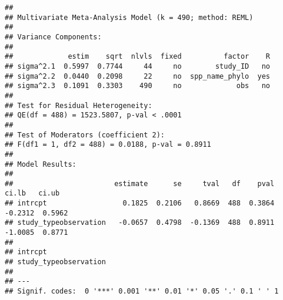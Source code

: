 \documentclass[]{article}
\newenvironment{Shaded}{\begin{snugshade}}{\end{snugshade}}
\newcommand{\KeywordTok}[1]{\textcolor[rgb]{0.13,0.29,0.53}{\textbf{#1}}}
\newcommand{\DataTypeTok}[1]{\textcolor[rgb]{0.13,0.29,0.53}{#1}}
\newcommand{\DecValTok}[1]{\textcolor[rgb]{0.00,0.00,0.81}{#1}}
\newcommand{\StringTok}[1]{\textcolor[rgb]{0.31,0.60,0.02}{#1}}
\newcommand{\CommentTok}[1]{\textcolor[rgb]{0.56,0.35,0.01}{\textit{#1}}}
\newcommand{\OperatorTok}[1]{\textcolor[rgb]{0.81,0.36,0.00}{\textbf{#1}}}
\newcommand{\NormalTok}[1]{#1}
\begin{document}
\begin{Shaded}
\end{Shaded}

\begin{verbatim}
## 
## Multivariate Meta-Analysis Model (k = 490; method: REML)
## 
## Variance Components:
## 
##             estim    sqrt  nlvls  fixed          factor    R 
## sigma^2.1  0.5997  0.7744     44     no        study_ID   no 
## sigma^2.2  0.0440  0.2098     22     no  spp_name_phylo  yes 
## sigma^2.3  0.1091  0.3303    490     no             obs   no 
## 
## Test for Residual Heterogeneity:
## QE(df = 488) = 1523.5807, p-val < .0001
## 
## Test of Moderators (coefficient 2):
## F(df1 = 1, df2 = 488) = 0.0188, p-val = 0.8911
## 
## Model Results:
## 
##                        estimate      se     tval   df    pval    ci.lb   ci.ub 
## intrcpt                  0.1825  0.2106   0.8669  488  0.3864  -0.2312  0.5962 
## study_typeobservation   -0.0657  0.4798  -0.1369  488  0.8911  -1.0085  0.8771 
##  
## intrcpt 
## study_typeobservation 
## 
## ---
## Signif. codes:  0 '***' 0.001 '**' 0.01 '*' 0.05 '.' 0.1 ' ' 1
\end{verbatim}
\end{document}
